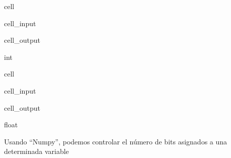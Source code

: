 \documentclass[letterpaper,10pt,english]{jupyterBook}
\begin{document}
\begin{sphinxuseclass}{cell}\begin{sphinxVerbatimInput}

\begin{sphinxuseclass}{cell_input}
\begin{sphinxVerbatim}[commandchars=\\\{\}]
 
\end{sphinxVerbatim}

\end{sphinxuseclass}\end{sphinxVerbatimInput}
\begin{sphinxVerbatimOutput}

\begin{sphinxuseclass}{cell_output}
\begin{sphinxVerbatim}[commandchars=\\\{\}]
int
\end{sphinxVerbatim}

\end{sphinxuseclass}\end{sphinxVerbatimOutput}

\end{sphinxuseclass}
\begin{sphinxuseclass}{cell}\begin{sphinxVerbatimInput}

\begin{sphinxuseclass}{cell_input}
\begin{sphinxVerbatim}[commandchars=\\\{\}]
 
\end{sphinxVerbatim}

\end{sphinxuseclass}\end{sphinxVerbatimInput}
\begin{sphinxVerbatimOutput}

\begin{sphinxuseclass}{cell_output}
\begin{sphinxVerbatim}[commandchars=\\\{\}]
float
\end{sphinxVerbatim}

\end{sphinxuseclass}\end{sphinxVerbatimOutput}

\end{sphinxuseclass}
\sphinxAtStartPar
Usando “Numpy”, podemos controlar el número de bits asignados a una determinada variable
\end{document}
